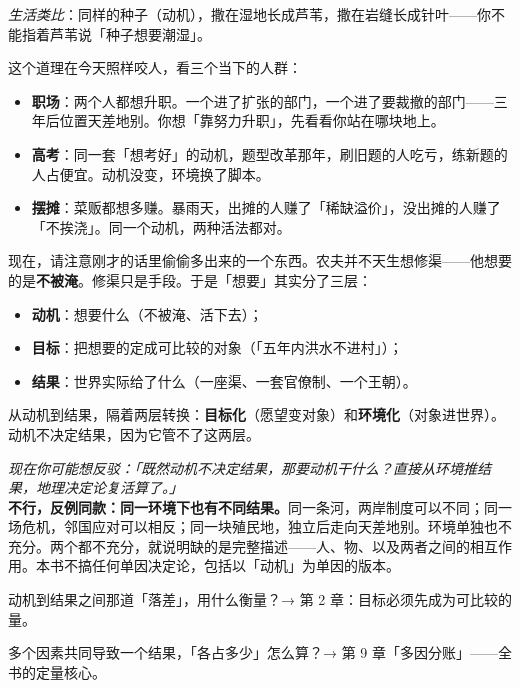 \documentclass[../../main2.tex]{subfiles}
\begin{document}
\textit{生活类比}：同样的种子（动机），撒在湿地长成芦苇，撒在岩缝长成针叶——你不能指着芦苇说「种子想要潮湿」。

这个道理在今天照样咬人，看三个当下的人群：

\begin{itemize}
	\item \textbf{职场}：两个人都想升职。一个进了扩张的部门，一个进了要裁撤的部门——三年后位置天差地别。你想「靠努力升职」，先看看你站在哪块地上。
	\item \textbf{高考}：同一套「想考好」的动机，题型改革那年，刷旧题的人吃亏，练新题的人占便宜。动机没变，环境换了脚本。
	\item \textbf{摆摊}：菜贩都想多赚。暴雨天，出摊的人赚了「稀缺溢价」，没出摊的人赚了「不挨浇」。同一个动机，两种活法都对。
\end{itemize}

现在，请注意刚才的话里偷偷多出来的一个东西。农夫并不天生想修渠——他想要的是\textbf{不被淹}。修渠只是手段。于是「想要」其实分了三层：

\begin{itemize}
	\item \textbf{动机}：想要什么（不被淹、活下去）；
	\item \textbf{目标}：把想要的定成可比较的对象（「五年内洪水不进村」）；
	\item \textbf{结果}：世界实际给了什么（一座渠、一套官僚制、一个王朝）。
\end{itemize}

从动机到结果，隔着两层转换：\textbf{目标化}（愿望变对象）和\textbf{环境化}（对象进世界）。动机不决定结果，因为它管不了这两层。

\begin{questionbox}
	\textit{现在你可能想反驳：「既然动机不决定结果，那要动机干什么？直接从环境推结果，地理决定论复活算了。」}\\
	\textbf{不行，反例同款：同一环境下也有不同结果。}同一条河，两岸制度可以不同；同一场危机，邻国应对可以相反；同一块殖民地，独立后走向天差地别。环境单独也不充分。两个都不充分，就说明缺的是完整描述——人、物、以及两者之间的相互作用。本书不搞任何单因决定论，包括以「动机」为单因的版本。
\end{questionbox}

\begin{reader_anticipation}
	\item 动机到结果之间那道「落差」，用什么衡量？→ 第 2 章：目标必须先成为可比较的量。
	\item 多个因素共同导致一个结果，「各占多少」怎么算？→ 第 9 章「多因分账」——全书的定量核心。
\end{reader_anticipation}
\end{document}
